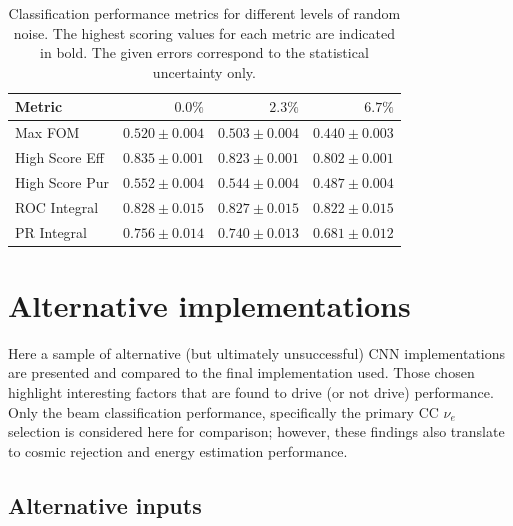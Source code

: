 \begin{table} %
    \begin{tabular}{lrrr}
        Metric         & $0.0\%$        & $2.3\%$ & $6.7\%$ \\
        \midrule
        Max FOM        & \textbf{$0.520\pm0.004$} & $0.503\pm0.004$ & $0.440\pm0.003$ \\
        High Score Eff & \textbf{$0.835\pm0.001$} & $0.823\pm0.001$ & $0.802\pm0.001$ \\
        High Score Pur & \textbf{$0.552\pm0.004$} & $0.544\pm0.004$ & $0.487\pm0.004$ \\
        ROC Integral   & \textbf{$0.828\pm0.015$} & $0.827\pm0.015$ & $0.822\pm0.015$ \\
        PR Integral    & \textbf{$0.756\pm0.014$} & $0.740\pm0.013$ & $0.681\pm0.012$ \\
    \end{tabular}
    \caption[Classification performance metrics for different levels of random noise]
    {Classification performance metrics for different levels of random noise. The highest scoring
        values for each metric are indicated in bold. The given errors correspond to the
        statistical uncertainty only.}
    \label{tab:calib_noise}
\end{table}

\section{Alternative implementations} %
\label{sec:results_alt} %

Here a sample of alternative (but ultimately unsuccessful) \chips CNN implementations are
presented and compared to the final implementation used. Those chosen highlight interesting
factors that are found to drive (or not drive) performance. Only the beam classification
performance, specifically the primary CC $\nu_{e}$ selection is considered here for comparison;
however, these findings also translate to cosmic rejection and energy estimation performance.

\subsection{Alternative inputs} %
\label{sec:results_alt_inputs} %

